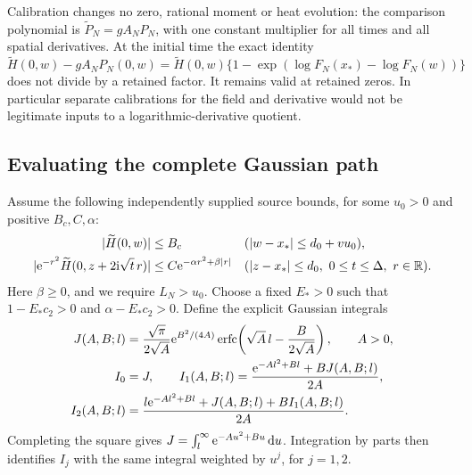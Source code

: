 Calibration changes no zero, rational moment or heat evolution:
the comparison polynomial is $\widetilde P_N=gA_NP_N$, with one
constant multiplier for all times and all spatial derivatives. At the
initial time the exact identity
\begin{equation}
 \widetilde H(0,w)-gA_NP_N(0,w)
 =\widetilde H(0,w)
    \{1-\exp(\log F_N(x_*)-\log F_N(w))\}
 \label{cond:exact-ratio}
\end{equation}
does not divide by a retained factor. It remains valid at retained
zeros. In particular separate calibrations for the field and derivative
would not be legitimate inputs to a logarithmic-derivative quotient.

\subsection{Evaluating the complete Gaussian path}

Assume the following independently supplied source bounds, for some
$u_0>0$ and positive $B_c,C,\alpha$:
\begin{align}
 |\widetilde H(0,w)|&\le B_c
       &&(|w-x_*|\le d_0+vu_0),\notag\\
 |\mathrm e^{-r^2}\widetilde H(0,z+2\mathrm i\sqrt t\,r)|
     &\le C\mathrm e^{-\alpha r^2+\beta|r|}
       &&(|z-x_*|\le d_0,\ 0\le t\le\Delta,\ r\in\mathbb R).
 \label{cond:source-majorants}
\end{align}
Here $\beta\ge0$, and we require $L_N>u_0$.
Choose a fixed $E_*>0$ such that
$1-E_*c_2>0$ and $\alpha-E_*c_2>0$.
Define the explicit Gaussian integrals
\begin{align}
 J(A,B;l)
 &=\frac{\sqrt\pi}{2\sqrt A}
       \mathrm e^{B^2/(4A)}
       \operatorname{erfc}\!\left(\sqrt A\,l-\frac B{2\sqrt A}\right),
       \qquad A>0,\notag\\
 I_0&=J,\qquad
 I_1(A,B;l)=\frac{\mathrm e^{-Al^2+Bl}+BJ(A,B;l)}{2A},\notag\\
 I_2(A,B;l)&=\frac{l\mathrm e^{-Al^2+Bl}+J(A,B;l)+BI_1(A,B;l)}{2A}.
 \label{cond:gaussian-integrals}
\end{align}
Completing the square gives $J=\int_l^\infty\mathrm e^{-Au^2+Bu}\,\mathrm d u$.
Integration by parts then identifies $I_j$ with the same integral
weighted by $u^j$, for $j=1,2$.

